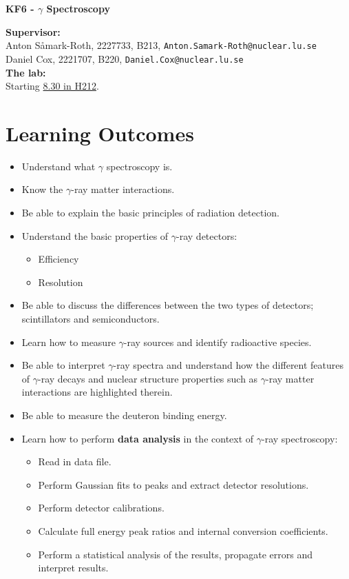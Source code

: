 \documentclass[12pt]{article}
\begin{document}
\begin{center} {\Large\bf\boldmath KF6 - $\gamma$ Spectroscopy}\\
\end{center}

{\bf Supervisor:}\\
Anton S\r{a}mark-Roth,     2227733, B213, \texttt{Anton.Samark-Roth@nuclear.lu.se}\\
Daniel Cox, 2221707, B220, \texttt{Daniel.Cox@nuclear.lu.se}\\

{\bf The lab:}\\
Starting \underline{8.30 in H212}.
\\

\section*{Learning Outcomes}
\begin{itemize}
  \item Understand what $\gamma$ spectroscopy is.
  \item Know the $\gamma$-ray matter interactions.
  \item Be able to explain the basic principles of radiation detection.
  \item Understand the basic properties of $\gamma$-ray detectors:
  \begin{itemize}
    \item Efficiency
    \item Resolution
  \end{itemize}
  \item Be able to discuss the differences between the two types of detectors; scintillators and semiconductors.
  \item Learn how to measure $\gamma$-ray sources and identify radioactive species.
  \item Be able to interpret $\gamma$-ray spectra and understand how the different features of $\gamma$-ray decays and nuclear structure properties such as $\gamma$-ray matter interactions are highlighted therein.
  \item Be able to measure the deuteron binding energy.
  \item Learn how to perform \textbf{data analysis} in the context of $\gamma$-ray spectroscopy:
  \begin{itemize}
    \item Read in data file.
    \item Perform Gaussian fits to peaks and extract detector resolutions.
    \item Perform detector calibrations.
    \item Calculate full energy peak ratios and internal conversion coefficients.
    \item Perform a statistical analysis of the results, propagate errors and interpret results.
  \end{itemize}
\end{itemize}
\end{document}
